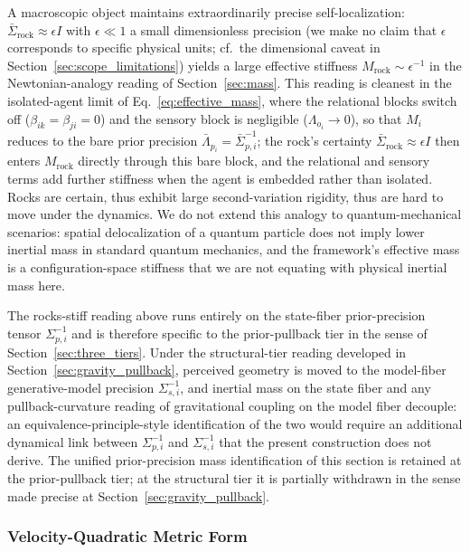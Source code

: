\documentclass[11pt]{article}
\begin{document}
A macroscopic object maintains extraordinarily precise self-localization: $\bar{\Sigma}_{\mathrm{rock}} \approx \epsilon I$ with $\epsilon \ll 1$ a small dimensionless precision (we make no claim that $\epsilon$ corresponds to specific physical units; cf.\ the dimensional caveat in Section~\ref{sec:scope_limitations}) yields a large effective stiffness $M_{\mathrm{rock}} \sim \epsilon^{-1}$ in the Newtonian-analogy reading of Section~\ref{sec:mass}. This reading is cleanest in the isolated-agent limit of Eq.~\eqref{eq:effective_mass}, where the relational blocks switch off ($\beta_{ik} = \beta_{ji} = 0$) and the sensory block is negligible ($\Lambda_{o_i} \to 0$), so that $M_i$ reduces to the bare prior precision $\bar{\Lambda}_{p_i} = \bar{\Sigma}_{p,i}^{-1}$; the rock's certainty $\bar{\Sigma}_{\mathrm{rock}} \approx \epsilon I$ then enters $M_{\mathrm{rock}}$ directly through this bare block, and the relational and sensory terms add further stiffness when the agent is embedded rather than isolated. Rocks are certain, thus exhibit large second-variation rigidity, thus are hard to move under the dynamics. We do not extend this analogy to quantum-mechanical scenarios: spatial delocalization of a quantum particle does not imply lower inertial mass in standard quantum mechanics, and the framework's effective mass is a configuration-space stiffness that we are not equating with physical inertial mass here.

The rocks-stiff reading above runs entirely on the state-fiber prior-precision tensor $\Sigma_{p,i}^{-1}$ and is therefore specific to the prior-pullback tier in the sense of Section~\ref{sec:three_tiers}. Under the structural-tier reading developed in Section~\ref{sec:gravity_pullback}, perceived geometry is moved to the model-fiber generative-model precision $\Sigma_{s,i}^{-1}$, and inertial mass on the state fiber and any pullback-curvature reading of gravitational coupling on the model fiber decouple: an equivalence-principle-style identification of the two would require an additional dynamical link between $\Sigma_{p,i}^{-1}$ and $\Sigma_{s,i}^{-1}$ that the present construction does not derive. The unified prior-precision mass identification of this section is retained at the prior-pullback tier; at the structural tier it is partially withdrawn in the sense made precise at Section~\ref{sec:gravity_pullback}.

\subsubsection{Velocity-Quadratic Metric Form}
\label{sec:velocity_quadratic}
\end{document}
